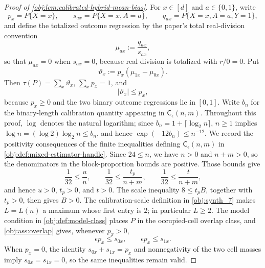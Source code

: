 \documentclass[11pt]{article}
\begin{document}
\begin{proof}[Proof of \cref{obj:lem:calibrated-hybrid-mean-bias}]
For \(x\in[d]\) and \(a\in\{0,1\}\), write
\[
p_x=P\{X=x\},\qquad
s_{ax}=P\{X=x,A=a\},\qquad
q_{ax}=P\{X=x,A=a,Y=1\},
\]
and define the totalized outcome regression by the paper's total real-division convention
\[
\mu_{ax}:=\frac{q_{ax}}{s_{ax}},
\]
so that \(\mu_{ax}=0\) when \(s_{ax}=0\), because real division is totalized with \(r/0=0\).  Put
\[
\vartheta_x:=p_x(\mu_{1x}-\mu_{0x}).
\]
Then \(\tau(P)=\sum_x\vartheta_x\), \(\sum_xp_x=1\), and
\[
|\vartheta_x|
\le p_x,
\]
because \(p_x\ge0\) and the two binary outcome regressions lie in \([0,1]\).  Write \(b_n\) for the binary-length calibration quantity appearing in \(\mathsf C_\epsilon(n,m)\).  Throughout this proof, \(\log\) denotes the natural logarithm; since \(b_n=1+\lceil\log_2 n\rceil\), \(n\ge1\) implies \(\log n=(\log 2)\log_2 n\le b_n\), and hence \(\exp(-12b_n)\le n^{-12}\).  We record the positivity consequences of the finite inequalities defining \(\mathsf C_\epsilon(n,m)\) in \cref{obj:def:mixed-estimator-handle}.  Since \(24\le n\), we have \(n>0\) and \(n+m>0\), so the denominators in the block-proportion bounds are positive.  Those bounds give
\[
\frac1{32}\le \frac un,
\qquad
\frac1{32}\le \frac{t_p}{n+m},
\qquad
\frac1{32}\le \frac t{n+m},
\]
and hence \(u>0\), \(t_p>0\), and \(t>0\).  The scale inequality \(8\le t_pB\), together with \(t_p>0\), then gives \(B>0\).  The calibration-scale definition in \cref{obj:synth_7} makes \(L=L(n)\) a maximum whose first entry is \(2\); in particular \(L\ge2\).  The model condition in \cref{obj:def:model-class} places \(P\) in the occupied-cell overlap class, and \cref{obj:ass:overlap} gives, whenever \(p_x>0\),
\[
\epsilon p_x\le s_{0x},
\qquad
\epsilon p_x\le s_{1x}.
\]
When \(p_x=0\), the identity \(s_{0x}+s_{1x}=p_x\) and nonnegativity of the
two cell masses imply \(s_{0x}=s_{1x}=0\), so the same inequalities remain
valid. %


\end{proof}
\end{document}
